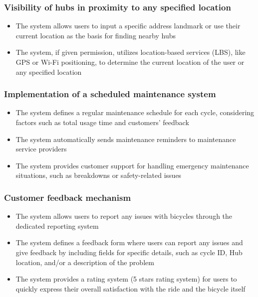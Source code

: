 \documentclass[11pt]{article}
\begin{document}
\subsubsection{Visibility of hubs in proximity to any specified location}
\begin{itemize}
    \item The system allows users to input a specific address landmark or use their current location as the basis for finding nearby hubs
    \item The system, if given permission, utilizes location-based services (LBS), like GPS or Wi-Fi positioning, to determine the current location of the user or any specified location
\end{itemize}

\subsubsection{Implementation of a scheduled maintenance system}
\begin{itemize}
    \item The system defines a regular maintenance schedule for each cycle, considering factors such as total usage time and customers' feedback
    \item The system automatically sends maintenance reminders to maintenance service providers
    \item The system provides customer support for handling emergency maintenance situations, such as breakdowns or safety-related issues
\end{itemize}

\subsubsection{Customer feedback mechanism}
\begin{itemize}
    \item The system allows users to report any issues with bicycles through the dedicated reporting system
    \item The system defines a feedback form where users can report any issues and give feedback by including fields for specific details, such as cycle ID, Hub location, and/or a description of the problem
    \item The system provides a rating system (5 stars rating system) for users to quickly express their overall satisfaction with the ride and the bicycle itself
\end{itemize}
\end{document}
